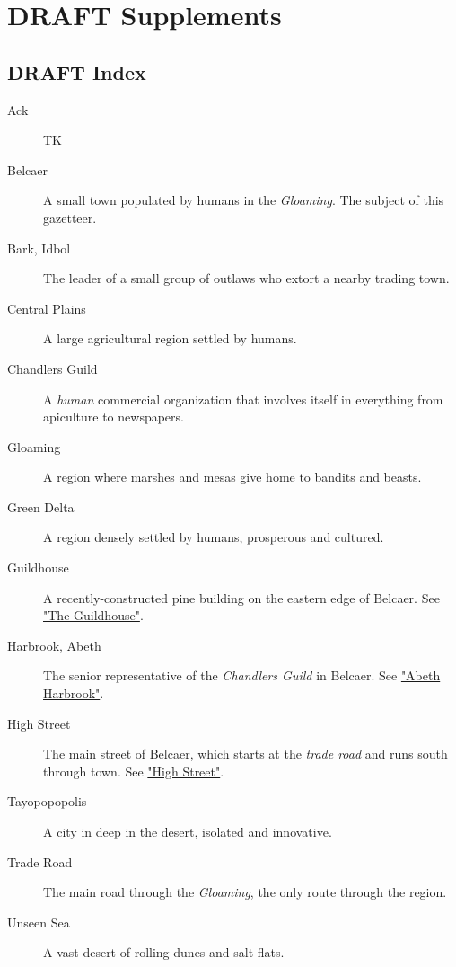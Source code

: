 \documentclass[11pt]{teraum_reference_book}
\begin{document}
\section*{{\bfseries\sffamily DRAFT} Supplements}
\label{sec:org6202c23}
\subsection*{{\bfseries\sffamily DRAFT} Index}
\label{sec:org750d5ae}
\begin{description}
\item[{Ack}] TK
\item[{Belcaer}] A small town populated by humans in the \emph{Gloaming}. The
subject of this gazetteer.
\item[{Bark, Idbol}] The leader of a small group of outlaws who extort a nearby trading town.
\item[{Central Plains}] A large agricultural region settled by humans.
\item[{Chandlers Guild}] A \emph{human} commercial organization that involves itself in everything from apiculture to newspapers.
\item[{Gloaming}] A region where marshes and mesas give home to bandits and beasts.
\item[{Green Delta}] A region densely settled by humans, prosperous and cultured.
\item[{Guildhouse}] A recently-constructed pine building on the eastern
edge of Belcaer. See \hyperref[sec:orgfaa06c5]{"The Guildhouse"}.
\item[{Harbrook, Abeth}] The senior representative of the \emph{Chandlers
Guild} in Belcaer. See \hyperref[sec:orgb59bad2]{"Abeth Harbrook"}.
\item[{High Street}] The main street of Belcaer, which starts at the
\emph{trade road} and runs south through town. See
\hyperref[sec:orgadb8d5a]{"High Street"}.
\item[{Tayopopopolis}] A city in deep in the desert, isolated and innovative.
\item[{Trade Road}] The main road through the \emph{Gloaming}, the only route through the region.
\item[{Unseen Sea}] A vast desert of rolling dunes and salt flats.
\end{description}
\end{document}
